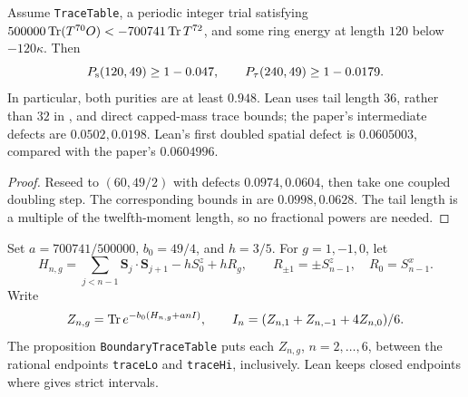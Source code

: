 \begin{lemma}
  \label{lem:boundary-reseed120}
  \leanok
  Assume \texttt{TraceTable}, a periodic integer trial satisfying
  \(500000\operatorname{Tr}(T^{70}O)<-700741\operatorname{Tr} T^{72}\), and some ring energy at length \(120\)
  below \(-120\kappa\). Then
  \[
    P_{\mathrm{s}}(120,49)\ge1-0.047,\qquad P_{\tau}(240,49)\ge1-0.0179.
  \]
  In particular, both purities are at least \(0.948\).
  Lean uses tail length \(36\), rather than \(32\) in \cite[Section 3]{OpenAIBoundary},
  and direct capped-mass trace bounds; the paper's intermediate defects are \(0.0502,0.0198\).
  Lean's first doubled spatial defect is \(0.0605003\), compared with the paper's \(0.0604996\).
\end{lemma}
\begin{proof}
  \leanok
  Reseed to \((60,49/2)\) with defects \(0.0974,0.0604\), then take one coupled doubling step.
  The corresponding bounds in \cite[Section 3]{OpenAIBoundary} are \(0.0998,0.0628\).
  The tail length is a multiple of the twelfth-moment length, so no fractional powers are needed.
\end{proof}

\begin{definition}
  \label{def:boundary-trace-table}
  \leanok
  Set \(a=700741/500000\), \(b_0=49/4\), and \(h=3/5\).
  For \(g=1,-1,0\), let
  \[
    H_{n,g}=\sum_{j<n-1}\mathbf S_j\cdot\mathbf S_{j+1}-hS_0^z+hR_g,\qquad
    R_{\pm1}=\pm S_{n-1}^z,\quad R_0=S_{n-1}^x.
  \]
  Write
  \[
    Z_{n,g}=\operatorname{Tr} e^{-b_0(H_{n,g}+anI)},\qquad
    I_n=(Z_{n,1}+Z_{n,-1}+4Z_{n,0})/6.
  \]
  The proposition \texttt{BoundaryTraceTable} puts each \(Z_{n,g}\), \(n=2,\ldots,6\), between
  the rational endpoints \texttt{traceLo} and \texttt{traceHi}, inclusively.
  Lean keeps closed endpoints where \cite[Appendix A.5]{OpenAIBoundary} gives strict intervals.
\end{definition}

